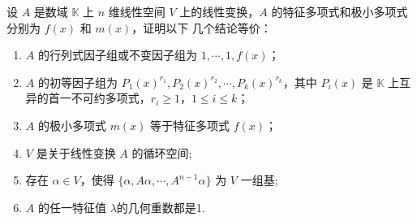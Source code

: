 \documentclass[../../main.tex]{subfiles}%
\begin{document}
\begin{theorem}[循环子空间的刻画]\label{theorem:循环子空间的刻画}
设 \(A\) 是数域 \(\mathbb{K}\) 上 \(n\) 维线性空间 \(V\) 上的线性变换，\(A\) 的特征多项式和极小多项式分别为 \(f(x)\) 和 \(m(x)\)，证明以下 几个结论等价：
\begin{enumerate}[(1)]
\item \(A\) 的行列式因子组或不变因子组为 \(1,\cdots,1,f(x)\)；

\item \(A\) 的初等因子组为 \(P_1(x)^{r_1},P_2(x)^{r_2},\cdots,P_k(x)^{r_k}\)，其中 \(P_i(x)\) 是 \(\mathbb{K}\) 上互异的首一不可约多项式，\(r_i\geqslant 1\)，\(1\leqslant  i\leqslant  k\)； 

\item \(A\) 的极小多项式 \(m(x)\) 等于特征多项式 \(f(x)\)； 

\item \(V\) 是关于线性变换 \(A\) 的循环空间;

\item 存在 \( \alpha \in V \)，使得 \( \{ \alpha, A\alpha, \cdots, A^{n - 1}\alpha \} \) 为 \( V \) 一组基;

\item \(A\) 的任一特征值 \( \lambda \)的几何重数都是1.
\end{enumerate}
\end{theorem}
\end{document}
